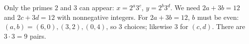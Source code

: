 Only the primes $2$ and $3$ can appear: $x=2^a3^c$, $y=2^b3^d$. We need $2a+3b=12$ and $2c+3d=12$ with nonnegative integers. For $2a+3b=12$, $b$ must be even: $(a,b)=(6,0),(3,2),(0,4)$, so $3$ choices; likewise $3$ for $(c,d)$. There are $3\cdot3=\boxed{9}$ pairs.
